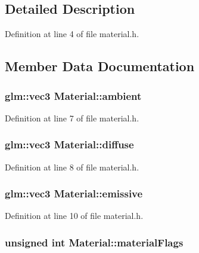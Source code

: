 \subsection{Detailed Description}


Definition at line 4 of file material.\+h.



\subsection{Member Data Documentation}
\hypertarget{class_material_af99c823542e497c98a35d1aac5fc9012}{}
\subsubsection[{ambient}]{\setlength{\rightskip}{0pt plus 5cm}glm\+::vec3 Material\+::ambient}\label{class_material_af99c823542e497c98a35d1aac5fc9012}


Definition at line 7 of file material.\+h.

\hypertarget{class_material_a099904e2f5a7bbec3cba6bf8ec546b11}{}
\subsubsection[{diffuse}]{\setlength{\rightskip}{0pt plus 5cm}glm\+::vec3 Material\+::diffuse}\label{class_material_a099904e2f5a7bbec3cba6bf8ec546b11}


Definition at line 8 of file material.\+h.

\hypertarget{class_material_ab35396b9c5340ce4a785884c54fbe2ac}{}
\subsubsection[{emissive}]{\setlength{\rightskip}{0pt plus 5cm}glm\+::vec3 Material\+::emissive}\label{class_material_ab35396b9c5340ce4a785884c54fbe2ac}


Definition at line 10 of file material.\+h.

\hypertarget{class_material_a86b8ac102b9af92d5bc715efd4068a91}{}
\subsubsection[{material\+Flags}]{\setlength{\rightskip}{0pt plus 5cm}unsigned int Material\+::material\+Flags}\label{class_material_a86b8ac102b9af92d5bc715efd4068a91}


